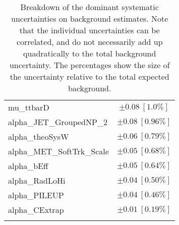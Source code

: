 \begin{table}
\begin{center}
\begin{tabular*}{\textwidth}{@{\extracolsep{\fill}}lc}
mu\_ttbarD         & $\pm 0.08\ [1.0\%] $       \\
alpha\_JET\_GroupedNP\_2         & $\pm 0.08\ [0.96\%] $       \\
alpha\_theoSysW         & $\pm 0.06\ [0.79\%] $       \\
alpha\_MET\_SoftTrk\_Scale         & $\pm 0.05\ [0.68\%] $       \\
alpha\_bEff         & $\pm 0.05\ [0.64\%] $       \\
alpha\_RadLoHi         & $\pm 0.04\ [0.50\%] $       \\
alpha\_PILEUP         & $\pm 0.04\ [0.46\%] $       \\
alpha\_CExtrap         & $\pm 0.01\ [0.19\%] $       \\
\noalign{\smallskip}\hline\noalign{\smallskip}
\end{tabular*}
\end{center}
\caption[Breakdown of uncertainty on background estimates]{
Breakdown of the dominant systematic uncertainties on background estimates.
Note that the individual uncertainties can be correlated, and do not necessarily add up quadratically to 
the total background uncertainty. The percentages show the size of the uncertainty relative to the total expected background.
\label{table.results.bkgestimate.uncertainties.SRD_high}}
\end{table}
%